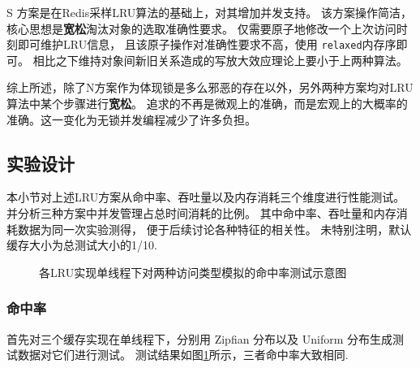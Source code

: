 S 方案是在Redis采样LRU算法的基础上，对其增加并发支持。
该方案操作简洁，核心思想是\textbf{宽松}淘汰对象的选取准确性要求。
仅需要原子地修改一个上次访问时刻即可维护LRU信息，
且该原子操作对准确性要求不高，使用 \verb|relaxed|内存序即可。
相比之下维持对象间新旧关系造成的写放大效应理论上要小于上两种算法。

综上所述，除了N方案作为体现锁是多么邪恶的存在以外，另外两种方案均对LRU算法中某个步骤进行\textbf{宽松}。
追求的不再是微观上的准确，而是宏观上的大概率的准确。这一变化为无锁并发编程减少了许多负担。

\subsection{实验设计}

本小节对上述LRU方案从命中率、吞吐量以及内存消耗三个维度进行性能测试。
并分析三种方案中并发管理占总时间消耗的比例。
其中命中率、吞吐量和内存消耗数据为同一次实验测得，
便于后续讨论各种特征的相关性。
未特别注明，默认缓存大小为总测试大小的1/10.

\begin{figure}
    \caption{各LRU实现单线程下对两种访问类型模拟的命中率测试示意图}
    \label{fig:dist_on_3_1thread}
\end{figure}

\subsubsection{命中率}

首先对三个缓存实现在单线程下，分别用 Zipfian 分布以及 Uniform 分布生成测试数据对它们进行测试。
测试结果如图\ref{fig:dist_on_3_1thread}所示，三者命中率大致相同.





